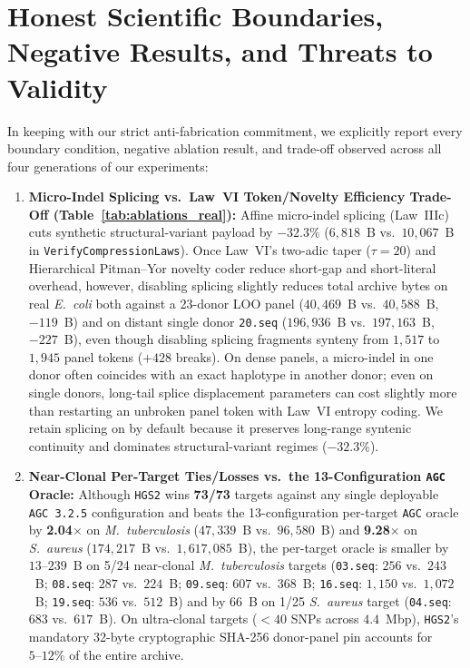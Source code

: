 \documentclass[10pt]{article}
\theoremstyle{definition}
\begin{document}
\section{Honest Scientific Boundaries, Negative Results, and Threats to Validity}

In keeping with our strict anti-fabrication commitment, we explicitly report every boundary condition, negative ablation result, and trade-off observed across all four generations of our experiments:

\begin{enumerate}
  \item \textbf{Micro-Indel Splicing vs.\ Law~VI Token/Novelty Efficiency Trade-Off (Table~\ref{tab:ablations_real}):}
  Affine micro-indel splicing (Law~IIIc) cuts synthetic structural-variant payload by \textbf{$-32.3\%$} ($6,818$~B vs.\ $10,067$~B in \texttt{VerifyCompressionLaws}). Once Law~VI's two-adic taper ($\tau=20$) and Hierarchical Pitman--Yor novelty coder reduce short-gap and short-literal overhead, however, disabling splicing slightly reduces total archive bytes on real \textit{E.~coli} both against a 23-donor LOO panel ($40,469$~B vs.\ $40,588$~B, $-119$~B) and on distant single donor \texttt{20.seq} ($196,936$~B vs.\ $197,163$~B, $-227$~B), even though disabling splicing fragments synteny from $1,517$ to $1,945$ panel tokens ($+428$ breaks). On dense panels, a micro-indel in one donor often coincides with an exact haplotype in another donor; even on single donors, long-tail splice displacement parameters can cost slightly more than restarting an unbroken panel token with Law~VI entropy coding. We retain splicing on by default because it preserves long-range syntenic continuity and dominates structural-variant regimes ($-32.3\%$).
  \item \textbf{Near-Clonal Per-Target Ties/Losses vs.\ the 13-Configuration \texttt{AGC} Oracle:}
  Although \texttt{HGS2} wins \textbf{73/73} targets against any single deployable \texttt{AGC~3.2.5} configuration and beats the 13-configuration per-target \texttt{AGC} oracle by \textbf{2.04$\times$} on \textit{M.~tuberculosis} ($47,339$~B vs.\ $96,580$~B) and \textbf{9.28$\times$} on \textit{S.~aureus} ($174,217$~B vs.\ $1,617,085$~B), the per-target oracle is smaller by $13\text{--}239$~B on 5/24 near-clonal \textit{M.~tuberculosis} targets (\texttt{03.seq}: $256$ vs.\ $243$~B; \texttt{08.seq}: $287$ vs.\ $224$~B; \texttt{09.seq}: $607$ vs.\ $368$~B; \texttt{16.seq}: $1,150$ vs.\ $1,072$~B; \texttt{19.seq}: $536$ vs.\ $512$~B) and by $66$~B on 1/25 \textit{S.~aureus} target (\texttt{04.seq}: $683$ vs.\ $617$~B). On ultra-clonal targets ($<40$ SNPs across $4.4$~Mbp), \texttt{HGS2}'s mandatory 32-byte cryptographic SHA-256 donor-panel pin accounts for $5\text{--}12\%$ of the entire archive.

\end{enumerate}
\end{document}
